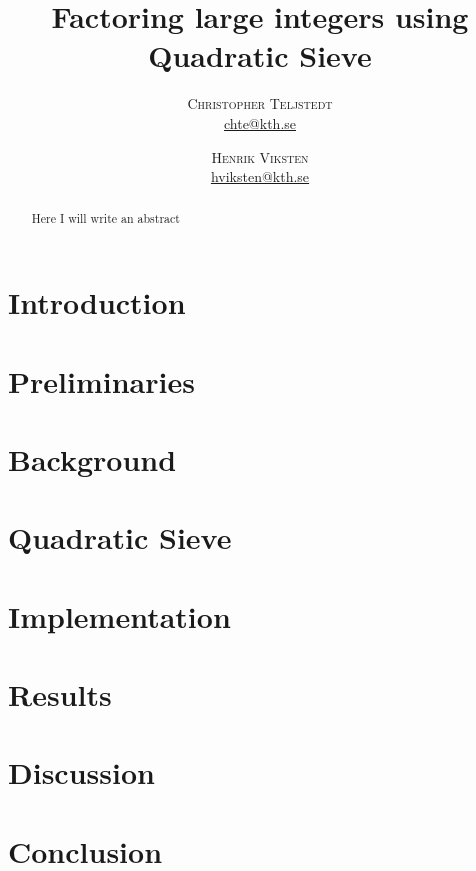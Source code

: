 \documentclass[twoside,11pt,english]{article}
\title{\vspace{-15mm}%
	\fontsize{24pt}{10pt}\selectfont
	\textbf{Factoring large integers using Quadratic Sieve}
	}
\author{%
	\large
	\textsc{Christopher Teljstedt} \\[2mm]
	\normalsize	\href{mailto:chte@kth.se}{chte@kth.se} 
	\and
	\textsc{Henrik Viksten} \\[2mm]
	\normalsize	\href{mailto:hviksten@kth.se}{hviksten@kth.se}
	}
\begin{document}
\maketitle
\thispagestyle{fancy}
\begin{abstract}
\noindent Here I will write an abstract
\end{abstract}
\newpage

\tableofcontents
\newpage
	

\begin{multicols}{2}
\section{Introduction}

\section{Preliminaries}

\section{Background}

\section{Quadratic Sieve}

\section{Implementation}

\section{Results}

\section{Discussion}

\section{Conclusion}


\newpage


\end{multicols}
\end{document}
